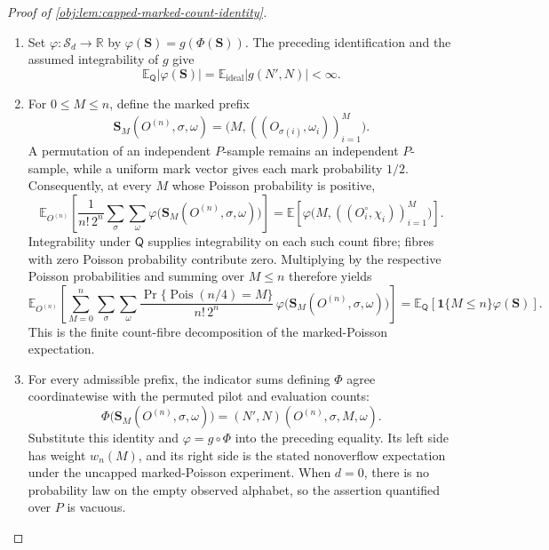 \begin{proof}[Proof of \cref{obj:lem:capped-marked-count-identity}]
\begin{enumerate}
\item Set \(\varphi:\mathcal S_d\to\mathbb R\) by \(\varphi(\mathbf S)=g(\Phi(\mathbf S))\). The preceding identification and the assumed integrability of \(g\) give
\[
\mathbb E_{\mathsf Q}|\varphi(\mathbf S)|
=\mathbb E_{\mathrm{ideal}}|g(N',N)|<\infty.
\]

\item For \(0\leq M\leq n\), define the marked prefix
\[
\mathbf S_M(O^{(n)},\sigma,\omega)
=\bigl(M,((O_{\sigma(i)},\omega_i))_{i=1}^M\bigr).
\]
A permutation of an independent \(P\)-sample remains an independent \(P\)-sample, while a uniform mark vector gives each mark probability \(1/2\). Consequently, at every \(M\) whose Poisson probability is positive,
\[
\mathbb E_{O^{(n)}}\!\left[
 \frac1{n!\,2^n}\sum_{\sigma}\sum_{\omega}
 \varphi\bigl(\mathbf S_M(O^{(n)},\sigma,\omega)\bigr)
 \right]
=
\mathbb E\!\left[
 \varphi\bigl(M,((O_i^\circ,\chi_i))_{i=1}^M\bigr)\right].
\]
Integrability under \(\mathsf Q\) supplies integrability on each such count fibre; fibres with zero Poisson probability contribute zero. Multiplying by the respective Poisson probabilities and summing over \(M\leq n\) therefore yields
\[
\mathbb E_{O^{(n)}}\!\left[
 \sum_{M=0}^n\sum_{\sigma}\sum_{\omega}
 \frac{\Pr\{\operatorname{Pois}(n/4)=M\}}{n!\,2^n}\,
 \varphi\bigl(\mathbf S_M(O^{(n)},\sigma,\omega)\bigr)
 \right]
=
\mathbb E_{\mathsf Q}\!\left[
 \mathbf1\{M\leq n\}\varphi(\mathbf S)\right].
\]
This is the finite count-fibre decomposition of the marked-Poisson expectation.

\item For every admissible prefix, the indicator sums defining \(\Phi\) agree coordinatewise with the permuted pilot and evaluation counts:
\[
\Phi\bigl(\mathbf S_M(O^{(n)},\sigma,\omega)\bigr)
=(N',N)(O^{(n)},\sigma,M,\omega).
\]
Substitute this identity and \(\varphi=g\circ\Phi\) into the preceding equality. Its left side has weight \(w_n(M)\), and its right side is the stated nonoverflow expectation under the uncapped marked-Poisson experiment. When \(d=0\), there is no probability law on the empty observed alphabet, so the assertion quantified over \(P\) is vacuous.
\end{enumerate}
\end{proof}
